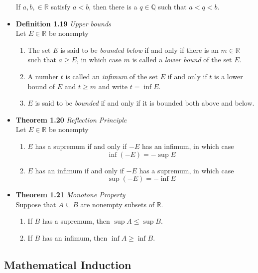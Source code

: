 \documentclass[11pt,a4paper]{article}
\begin{document}
\begin{itemize}
        If $a, b, \in \mathbb{R}$ satisfy $a < b$, then there is a $q \in \mathbb{Q}$
        such that $a < q < b$.
    \item \textbf{Definition 1.19} \emph{Upper bounds} \\
        Let $E \in \mathbb{R}$ be nonempty
        \begin{enumerate}
            \item The set $E$ is said to be \emph{bounded below} if and only if there is an
                $m \in \mathbb{R}$ such that $a \geq E$, in which case $m$ is called a
                \emph{lower bound} of the set $E$.
            \item A number $t$ is called an \emph{infimum} of the set $E$ if and only if $t$
                is a lower bound of $E$ and $t \geq m$ and write $t = \inf E$.
            \item $E$ is said to be \emph{bounded} if and only if it is bounded both above and
                below.
        \end{enumerate}
    \item \textbf{Theorem 1.20} \emph{Reflection Principle} \\
        Let $E \in \mathbb{R}$ be nonempty
        \begin{enumerate}
            \item $E$ has a supremum if and only if $-E$ has an infimum, in which case
                \[
                    \inf (-E) = -\sup E
                \]
            \item $E$ has an infimum if and only if $-E$ has a supremum, in which case
                \[
                    \sup (-E) = -\inf E
                \]
        \end{enumerate}
    \item \textbf{Theorem 1.21} \emph{Monotone Property} \\
        Suppose that $A \subseteq B$ are nonempty subsets of $\mathbb{R}$.
        \begin{enumerate}
            \item If $B$ has a supremum, then $\sup A \leq \sup B$.
            \item If $B$ has an infimum, then $\inf A \geq \inf B$.
        \end{enumerate}
\end{itemize}

\subsection{Mathematical Induction}
\end{document}
